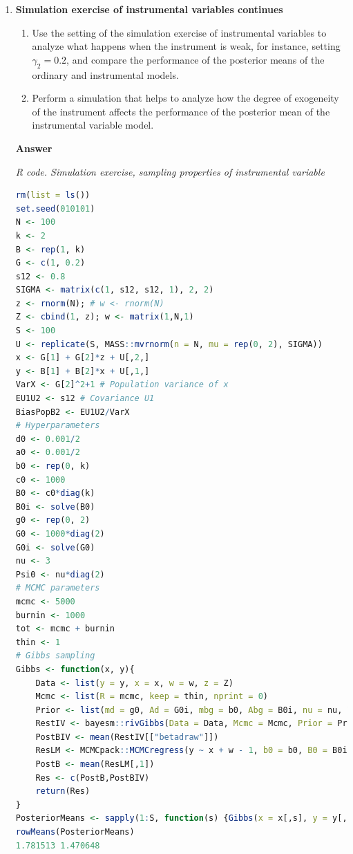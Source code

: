 \begin{enumerate}[leftmargin=*]
\item \textbf{Simulation exercise of instrumental variables continues}

\begin{enumerate}
	\item Use the setting of the simulation exercise of instrumental variables to analyze what happens when the instrument is weak, for instance, setting $\gamma_2=0.2$, and compare the performance of the posterior means of the ordinary and instrumental models.
	\item Perform a simulation that helps to analyze how the degree of exogeneity of the instrument affects the performance of the posterior mean of the instrumental variable model.	 
\end{enumerate}

\textbf{Answer}

\begin{tcolorbox}[enhanced,width=4.67in,center upper,
	fontupper=\large\bfseries,drop shadow southwest,sharp corners]
	\textit{R code. Simulation exercise, sampling properties of instrumental variable}
	\begin{VF}
		\begin{lstlisting}[language=R]
rm(list = ls())
set.seed(010101)
N <- 100
k <- 2
B <- rep(1, k)
G <- c(1, 0.2)
s12 <- 0.8
SIGMA <- matrix(c(1, s12, s12, 1), 2, 2)
z <- rnorm(N); # w <- rnorm(N)
Z <- cbind(1, z); w <- matrix(1,N,1)
S <- 100
U <- replicate(S, MASS::mvrnorm(n = N, mu = rep(0, 2), SIGMA))
x <- G[1] + G[2]*z + U[,2,]
y <- B[1] + B[2]*x + U[,1,]
VarX <- G[2]^2+1 # Population variance of x
EU1U2 <- s12 # Covariance U1
BiasPopB2 <- EU1U2/VarX
# Hyperparameters
d0 <- 0.001/2
a0 <- 0.001/2
b0 <- rep(0, k)
c0 <- 1000
B0 <- c0*diag(k)
B0i <- solve(B0)
g0 <- rep(0, 2)
G0 <- 1000*diag(2)
G0i <- solve(G0)
nu <- 3
Psi0 <- nu*diag(2)
# MCMC parameters
mcmc <- 5000
burnin <- 1000
tot <- mcmc + burnin
thin <- 1
# Gibbs sampling
Gibbs <- function(x, y){
	Data <- list(y = y, x = x, w = w, z = Z)
	Mcmc <- list(R = mcmc, keep = thin, nprint = 0)
	Prior <- list(md = g0, Ad = G0i, mbg = b0, Abg = B0i, nu = nu, V = Psi0)
	RestIV <- bayesm::rivGibbs(Data = Data, Mcmc = Mcmc, Prior = Prior)
	PostBIV <- mean(RestIV[["betadraw"]])
	ResLM <- MCMCpack::MCMCregress(y ~ x + w - 1, b0 = b0, B0 = B0i, c0 = a0, d0 = d0)
	PostB <- mean(ResLM[,1])
	Res <- c(PostB,PostBIV)
	return(Res)
}
PosteriorMeans <- sapply(1:S, function(s) {Gibbs(x = x[,s], y = y[,s])})
rowMeans(PosteriorMeans)
1.781513 1.470648
\end{lstlisting}
	\end{VF}
\end{tcolorbox} 


\end{enumerate}
